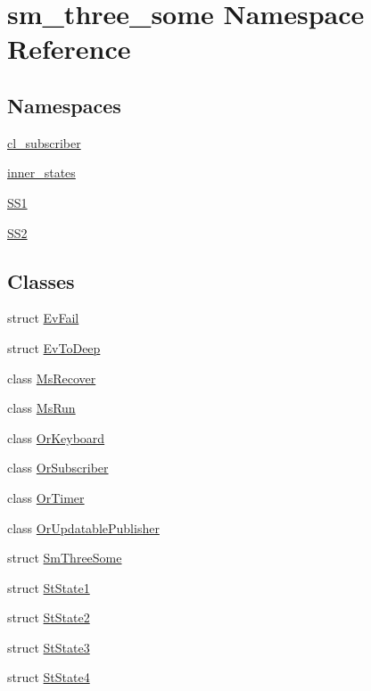 \hypertarget{namespacesm__three__some}{}\section{sm\+\_\+three\+\_\+some Namespace Reference}
\label{namespacesm__three__some}
\subsection*{Namespaces}
\begin{DoxyCompactItemize}
\item 
 \hyperlink{namespacesm__three__some_1_1cl__subscriber}{cl\+\_\+subscriber}
\item 
 \hyperlink{namespacesm__three__some_1_1inner__states}{inner\+\_\+states}
\item 
 \hyperlink{namespacesm__three__some_1_1SS1}{S\+S1}
\item 
 \hyperlink{namespacesm__three__some_1_1SS2}{S\+S2}
\end{DoxyCompactItemize}
\subsection*{Classes}
\begin{DoxyCompactItemize}
\item 
struct \hyperlink{structsm__three__some_1_1EvFail}{Ev\+Fail}
\item 
struct \hyperlink{structsm__three__some_1_1EvToDeep}{Ev\+To\+Deep}
\item 
class \hyperlink{classsm__three__some_1_1MsRecover}{Ms\+Recover}
\item 
class \hyperlink{classsm__three__some_1_1MsRun}{Ms\+Run}
\item 
class \hyperlink{classsm__three__some_1_1OrKeyboard}{Or\+Keyboard}
\item 
class \hyperlink{classsm__three__some_1_1OrSubscriber}{Or\+Subscriber}
\item 
class \hyperlink{classsm__three__some_1_1OrTimer}{Or\+Timer}
\item 
class \hyperlink{classsm__three__some_1_1OrUpdatablePublisher}{Or\+Updatable\+Publisher}
\item 
struct \hyperlink{structsm__three__some_1_1SmThreeSome}{Sm\+Three\+Some}
\item 
struct \hyperlink{structsm__three__some_1_1StState1}{St\+State1}
\item 
struct \hyperlink{structsm__three__some_1_1StState2}{St\+State2}
\item 
struct \hyperlink{structsm__three__some_1_1StState3}{St\+State3}
\item 
struct \hyperlink{structsm__three__some_1_1StState4}{St\+State4}
\end{DoxyCompactItemize}
